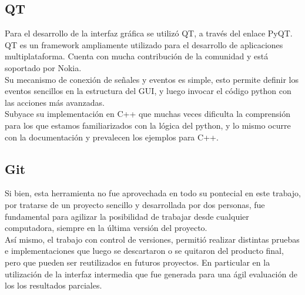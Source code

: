 \subsection*{QT}
Para el desarrollo de la interfaz gr\'afica se utiliz\'o QT, a trav\'es del enlace PyQT.\\
QT es un framework ampliamente utilizado para el desarrollo de aplicaciones multiplataforma. Cuenta con mucha contribuci\'on de la comunidad y est\'a soportado por Nokia.\\ Su mecanismo de conexión de señales y eventos es simple, esto permite definir los eventos sencillos en la estructura del GUI, y luego invocar el c\'odigo python con las acciones m\'as avanzadas.\\
Subyace su implementaci\'on en C++ que muchas veces dificulta la comprensi\'on para los que estamos familiarizados con la l\'ogica del python, y lo mismo ocurre con la documentaci\'on y prevalecen los ejemplos para C++.\\

\subsection*{Git}
Si bien, esta herramienta no fue aprovechada en todo su pontecial en este trabajo, por tratarse de un proyecto sencillo y desarrollada por dos personas, fue fundamental para agilizar la posibilidad de trabajar desde cualquier computadora, siempre en la \'ultima versi\'on del proyecto.\\
As\'i mismo, el trabajo con control de versiones, permiti\'o realizar distintas pruebas e implementaciones que luego se descartaron o se quitaron del producto final, pero que pueden ser reutilizados en futuros proyectos. En particular en la utilizaci\'on de la interfaz intermedia que fue generada para una \'agil evaluaci\'on de los los resultados parciales.\\









